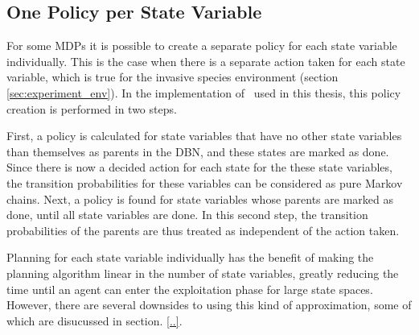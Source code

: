 \subsection{One Policy per State Variable }
For some MDPs it is possible to create a separate policy for each state variable individually. This is the case when there is a separate action taken for each state variable, which is true for the invasive species environment (section \ref{sec:experiment_env}). In the implementation of \etre\ used in this thesis, this policy creation is performed in two steps. 

First, a policy is calculated for state variables that have no other state variables than themselves as parents in the DBN, and these states are marked as done. Since there is now a decided action for each state for the these state variables, the transition probabilities for these variables can be considered as pure Markov chains. Next, a policy is found for state variables whose parents are marked as done, until all state variables are done. In this second step, the transition probabilities of the parents are thus treated as independent of the action taken. 

Planning for each state variable individually has the benefit of making the planning algorithm linear in the number of state variables, greatly reducing the time until an agent can enter the exploitation phase for large state spaces. However, there are several downsides to using this kind of approximation, some of which are disucussed in section. \ref{..}. 